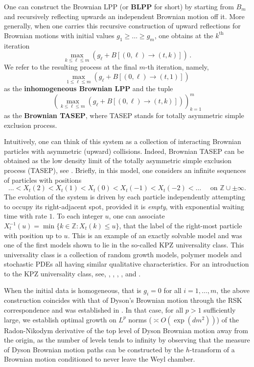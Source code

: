 \documentclass[11pt, reqno]{amsart}
\numberwithin{equation}{section}
\newcommand{\Z}{\ensuremath{\mathbb{Z}}}
\begin{document}
One can construct the Brownian LPP (or \textbf{BLPP} for short) by starting from $B_m$ and recursively reflecting upwards an independent Brownian motion off it. More generally, when one carries this recursive construction of upward reflections for Brownian motions with initial values $g_1
\ge \ldots 
\ge g_m$, one obtains at the $k^{\mathrm{th}}$ iteration 
\[
\displaystyle\max_{k\le \ell \le m}(g_{\ell} + B[(0,\ell)\to (t, k)])\,.
\]
We refer to the resulting process at the final $m$-th iteration, namely,
\begin{equation}\label{eq: inhom BLPP}
\displaystyle\max_{1\le \ell \le m}(g_{\ell} + B[(0,\ell)\to (t, 1)])
\end{equation}
as the \textbf{inhomogeneous Brownian LPP} and the tuple
\[
(\displaystyle\max_{k\le \ell \le m}(g_{\ell} + B[(0,\ell)\to (t, k)]))_{k=1}^m
\]
as the \textbf{Brownian TASEP}, where TASEP stands for totally asymmetric simple exclusion process. 

Intuitively, one can think of this system as a collection of interacting Brownian particles with asymmetric (upward) collisions. Indeed, Brownian TASEP can be obtained as the low density limit of the totally asymmetric simple exclusion process (TASEP), see \cite{gorin2015limits}. Briefly, in this model, one considers an infinite sequences of particles with positions
\[
\dots<X_t(2)<X_t(1)<X_t(0)<X_t(-1)<X_t(-2)<\dots \quad \text{ on } \Z\cup\pm \infty.
\] 
The evolution of the system is driven by each particle independently attempting to occupy its right-adjacent spot, provided it is \textit{empty}, with exponential waiting time with rate \(1\). To each integer \(u\), one can associate \(X^{-1}_t(u) = \min\{k\in \Z: X_t(k)\leq u\}\), that the label of the right-most particle with position up to \(u\). This is an example of an exactly solvable model and was one of the first models shown to lie in the so-called KPZ universality class. This universality class is a collection of random growth models, polymer models and stochastic PDEs all having similar qualitative characteristics. For an introduction to the KPZ universality class, see\cite{quastel2011introduction}, \cite{ferrari2010random}, \cite{romik2015surprising}, \cite{corwin2016kardar}, \cite{weiss2017reflected}, \cite{ganguly2021random} and \cite{ZygourasalgKPZ}.

When the initial data is homogeneous, that is $g_i=0$ for all $i=1,\ldots,m$, the above construction coincides with that of Dyson's Brownian motion through the RSK correspondence and was established in \cite{O2002representation}. In that case, for all $p>1$ sufficiently large, we establish optimal growth on $L^p$ norms ($\asymp O(\exp(dm^2))$) of the Radon-Nikodym derivative of the top level of Dyson Brownian motion away from the origin, as the number of levels tends to infinity by observing that the measure of Dyson Brownian motion paths can be constructed by the $h$-transform of a Brownian motion conditioned to never leave the Weyl chamber.
\end{document}
